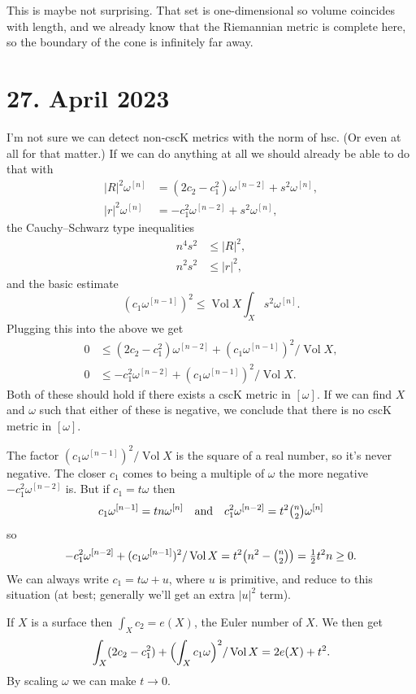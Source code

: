 \documentclass[11pt]{amsart}
\theoremstyle{definition}
\def\^#1{^{[#1]}}
\def\qandq{\quad\text{and}\quad}
\DeclareMathOperator{\Vol}{Vol}
\begin{document}
This is maybe not surprising.
That set is one-dimensional so volume coincides with length,
and we already know that the Riemannian metric is complete here, so the boundary of the cone is infinitely far away.

\section{27. April 2023}

I'm not sure we can detect non-cscK metrics with the norm of hsc.
(Or even at all for that matter.)
If we can do anything at all we should already be able to do that with
\begin{align*}
|R|^2 \omega\^{n}
&= (2c_2 - c_1^2) \omega\^{n-2} + s^2 \omega\^n,
\\
|r|^2 \omega\^{n}
&= -c_1^2 \omega\^{n-2} + s^2 \omega\^n,
\end{align*}
the Cauchy--Schwarz type inequalities
\begin{align*}
	n^4 s^2 &\leq |R|^2,
	\\
	n^2 s^2 &\leq |r|^2,
\end{align*}
and the basic estimate
$$
(c_1 \omega\^{n-1})^2 \leq
\Vol X \int_X s^2 \omega\^n.
$$
Plugging this into the above we get
\begin{align*}
0 &\leq (2c_2 - c_1^2) \omega\^{n-2} + (c_1 \omega\^{n-1})^2 / \Vol X,
\\
0 &\leq -c_1^2 \omega\^{n-2} + (c_1 \omega\^{n-1})^2 / \Vol X.
\end{align*}
Both of these should hold if there exists a cscK metric in $[\omega]$.
If we can find $X$ and $\omega$ such that either of these is negative,
we conclude that there is no cscK metric in $[\omega]$.

The factor $(c_1 \omega\^{n-1})^2 / \Vol X$ is the square of a real number,
so it's never negative.
The closer $c_1$ comes to being a multiple of $\omega$ the more negative $-c_1^2\omega\^{n-2}$ is.
But if $c_1 = t \omega$ then
$$
c_1 \omega\^{n-1} = tn \omega\^n
\qandq
c_1^2 \omega\^{n-2} = t^2 \tbinom{n}{2} \omega\^n
$$
so
$$
- c_1^2 \omega\^{n-2} + (c_1\omega\^{n-1})^2 / \Vol X
= t^2 \bigl(n^2 - \tbinom{n}{2}\bigr)
= \tfrac12 t^2 n \geq 0.
$$
We can always write $c_1 = t\omega + u$, where $u$ is primitive, and reduce to
this situation (at best; generally we'll get an extra $|u|^2$ term).

If $X$ is a surface then $\int_X c_2 = e(X)$, the Euler number of $X$.
We then get
$$
\int_X (2c_2 - c_1^2) + \Bigl(\int_X c_1\omega\Bigr)^2/\Vol X
= 2 e(X) + t^2.
$$
By scaling $\omega$ we can make $t \to 0$.
\end{document}
